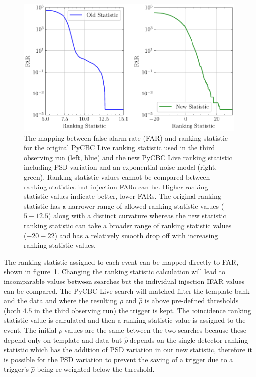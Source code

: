 \begin{figure}
      \centering
    \includegraphics[width=1.0\textwidth]{images/5_pycbclive/fits-psd/fits_psd_far_vs_stat.pdf}
    \caption{The mapping between false-alarm rate (FAR) and ranking statistic for the original PyCBC Live ranking statistic used in the third observing run (left, blue) and the new PyCBC Live ranking statistic including PSD variation and an exponential noise model (right, green). Ranking statistic values cannot be compared between ranking statistics but injection FARs can be. Higher ranking statistic values indicate better, lower FARs. The original ranking statistic has a narrower range of allowed ranking statistic values ($5 - 12.5$) along with a distinct curvature whereas the new statistic ranking statistic can take a broader range of ranking statistic values ($-20-22$) and has a relatively smooth drop off with increasing ranking statistic values.}
    \label{5:fig:fits-psdvar-far-stat}
\end{figure}
%
The ranking statistic assigned to each event can be mapped directly to FAR, shown in figure~\ref{5:fig:fits-psdvar-far-stat}. Changing the ranking statistic calculation will lead to incomparable values between searches but the individual injection IFAR values can be compared. The PyCBC Live search will matched filter the template bank and the data and where the resulting $\rho$ and $\hat{\rho}$ is above pre-defined thresholds (both $4.5$ in the third observing run) the trigger is kept. The coincidence ranking statistic value is calculated and then a ranking statistic value is assigned to the event. The initial $\rho$ values are the same between the two searches because these depend only on template and data but $\hat{\rho}$ depends on the single detector ranking statistic which has the addition of PSD variation in our new statistic, therefore it is possible for the PSD variation to prevent the saving of a trigger due to a trigger's $\hat{\rho}$ being re-weighted below the threshold.

